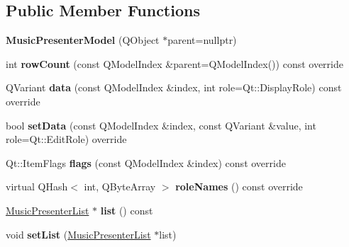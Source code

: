 \subsection*{Public Member Functions}
\begin{DoxyCompactItemize}
\item 
\mbox{\label{class_music_presenter_model_a361441da604e68b066dbeeda6b349e5f}} 
{\bfseries Music\+Presenter\+Model} (Q\+Object $\ast$parent=nullptr)
\item 
\mbox{\label{class_music_presenter_model_a771f733a651f6a2d91717e5018fbaaa7}} 
int {\bfseries row\+Count} (const Q\+Model\+Index \&parent=Q\+Model\+Index()) const override
\item 
\mbox{\label{class_music_presenter_model_a0cb9d531421fde36880d607944dd399b}} 
Q\+Variant {\bfseries data} (const Q\+Model\+Index \&index, int role=Qt\+::\+Display\+Role) const override
\item 
\mbox{\label{class_music_presenter_model_ad1ef19cdba7dd3528daa96e85cf510fe}} 
bool {\bfseries set\+Data} (const Q\+Model\+Index \&index, const Q\+Variant \&value, int role=Qt\+::\+Edit\+Role) override
\item 
\mbox{\label{class_music_presenter_model_accdf24c158fac2167c990920d931d5bb}} 
Qt\+::\+Item\+Flags {\bfseries flags} (const Q\+Model\+Index \&index) const override
\item 
\mbox{\label{class_music_presenter_model_a4f0154972fc0cf66972613abc0d056f3}} 
virtual Q\+Hash$<$ int, Q\+Byte\+Array $>$ {\bfseries role\+Names} () const override
\item 
\mbox{\label{class_music_presenter_model_a516748de38693824273deb3d887c72f6}} 
\mbox{\hyperlink{class_music_presenter_list}{Music\+Presenter\+List}} $\ast$ {\bfseries list} () const
\item 
\mbox{\label{class_music_presenter_model_ab57bce25e4c398f9590e6c9c13dd9ccf}} 
void {\bfseries set\+List} (\mbox{\hyperlink{class_music_presenter_list}{Music\+Presenter\+List}} $\ast$list)
\end{DoxyCompactItemize}

